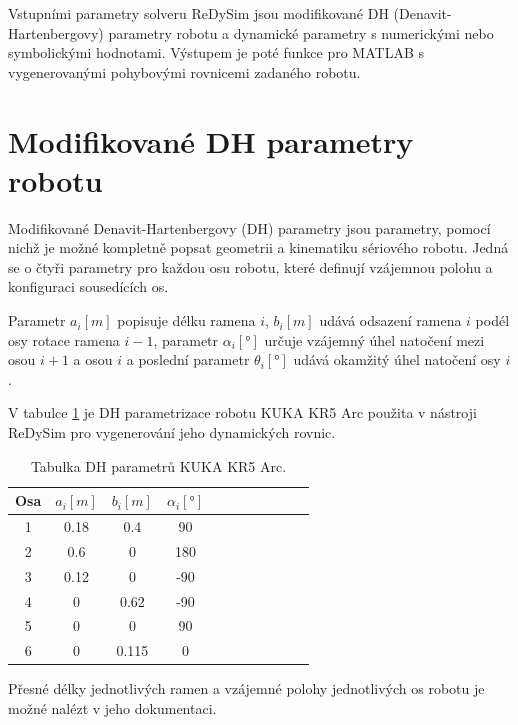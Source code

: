 Vstupními parametry solveru ReDySim jsou modifikované DH (Denavit-Hartenbergovy) parametry robotu a dynamické parametry s numerickými nebo symbolickými hodnotami. Výstupem je poté funkce pro MATLAB s vygenerovanými pohybovými rovnicemi zadaného robotu.  

\section{Modifikované DH parametry robotu}

Modifikované Denavit-Hartenbergovy (DH) parametry jsou parametry, pomocí nichž je možné kompletně popsat geometrii a kinematiku sériového robotu. Jedná se o čtyři parametry pro každou osu robotu, které definují vzájemnou polohu a konfiguraci sousedících os. 

Parametr $a_i [m]$ popisuje délku ramena $i$, $b_i [m]$ udává odsazení ramena $i$ podél osy rotace ramena $i-1$, parametr $\alpha_i [\si{\degree}]$ určuje vzájemný úhel natočení mezi osou $i+1$ a osou $i$ a poslední parametr $\theta_i [\si{\degree}]$ udává okamžitý úhel natočení osy $i$.

V tabulce \ref{tab_DH_kuka} je DH parametrizace robotu KUKA KR5 Arc použita v nástroji ReDySim pro vygenerování jeho dynamických rovnic.

\begin{table}[htbp]
  \centering
  \caption{Tabulka DH parametrů KUKA KR5 Arc.}
    \begin{tabular}{c|cccccccccc}
    \multicolumn{1}{c|}{Osa} & \multicolumn{1}{c}{$a_{i} [m]$} & \multicolumn{1}{c}{$b_{i} [m]$} & \multicolumn{1}{c}{$\alpha_{i} [\si{\degree}]$} \\
    \hline
    1     &   0.18  &  0.4   &  90     &     \\
    2     &   0.6   &  0     &  180    &     \\
    3     &   0.12  &  0     &  -90    &     \\
    4     &   0     &  0.62  &  -90    &     \\
    5     &   0     &  0     &  90     &     \\
    6     &   0     &  0.115 &  0      &     \\
    \end{tabular}%
  \label{tab_DH_kuka}%
\end{table}%

Přesné délky jednotlivých ramen a vzájemné polohy jednotlivých os robotu je možné nalézt v jeho dokumentaci.

